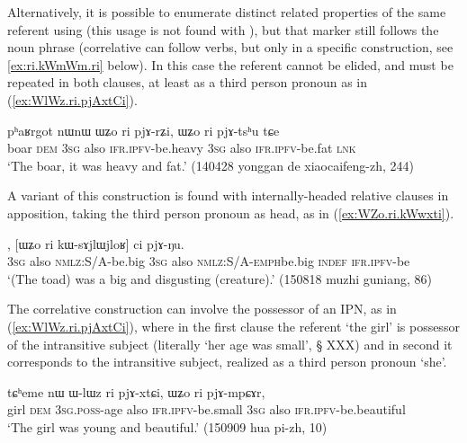 Alternatively, it is possible to enumerate distinct related properties of the same referent using  (this usage is not found with ), but that marker still follows the noun phrase (correlative  can follow verbs, but only in a specific construction, see \ref{ex:ri.kWmWm.ri} below). In this case the referent cannot be elided, and must be repeated in both clauses, at least as a third person pronoun  as in (\ref{ex:WlWz.ri.pjAxtCi}). 

  \begin{exe}
\ex \label{ex:WlWz.ri.pjArZi}
 \gll pʰaʁrgot nɯnɯ ɯʑo ri pjɤ-rʑi, ɯʑo ri pjɤ-tsʰu tɕe \\
 boar \textsc{dem} \textsc{3sg} also \textsc{ifr}.\textsc{ipfv}-be.heavy \textsc{3sg} also \textsc{ifr}.\textsc{ipfv}-be.fat \textsc{lnk} \\ 
\glt  `The boar, it was heavy and fat.' (140428 yonggan de xiaocaifeng-zh, 244)
 \end{exe}

A variant of this construction is found with internally-headed relative clauses in apposition, taking the third person pronoun  as head, as in (\ref{ex:WZo.ri.kWwxti}).

\begin{exe}
\ex \label{ex:WZo.ri.kWwxti}
, [ɯʑo ri kɯ-sɤjlɯ\redp{}jloʁ] ci pjɤ-ŋu. \\
\textsc{3sg} also \textsc{nmlz}:S/A-be.big \textsc{3sg} also \textsc{nmlz}:S/A-\textsc{emph}\redp{}be.big \textsc{indef} \textsc{ifr}.\textsc{ipfv}-be \\
\glt `(The toad) was a big and disgusting (creature).' (150818 muzhi guniang, 86)
\end{exe}

 
The correlative construction can involve the possessor of an IPN, as in (\ref{ex:WlWz.ri.pjAxtCi}), where in the first clause the referent `the girl' is possessor of the intransitive subject (literally `her age was small', § XXX) and in second it corresponds to the intransitive subject, realized as a third person pronoun  `she'.

  \begin{exe}
\ex \label{ex:WlWz.ri.pjAxtCi}
 \gll tɕʰeme nɯ ɯ-lɯz ri pjɤ-xtɕi, ɯʑo ri pjɤ-mpɕɤr,  \\
 girl \textsc{dem} \textsc{3sg}.\textsc{poss}-age also \textsc{ifr}.\textsc{ipfv}-be.small \textsc{3sg} also \textsc{ifr}.\textsc{ipfv}-be.beautiful \\
\glt `The girl was young and beautiful.' (150909 hua pi-zh, 10)
 \end{exe}
 

